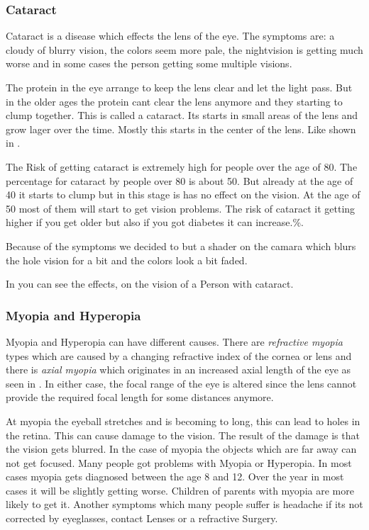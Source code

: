 \documentclass{sig-alternate-05-2015}
\begin{document}
\subsubsection{Cataract}

Cataract is a disease which effects the lens of the eye. The symptoms are: a cloudy of blurry vision, the colors seem more pale, the nightvision is getting much worse and in some cases the person getting some multiple visions.

The protein in the eye arrange to keep the lens clear and let the light pass. But in the older ages the protein cant clear the lens anymore and they starting to clump together. This is called a cataract. Its starts in small areas of the lens and grow lager over the time. Mostly this starts in the center of the lens. Like shown in .

The Risk of getting cataract is extremely high for people over the age of 80. The percentage for cataract by people over 80 is about 50. But already at the age of 40 it starts to clump but in this stage is has no effect on the vision. At the age of 50 most of them will start to get vision problems. The risk of cataract it getting higher if you get older but also if you got diabetes it can increase.\%.~\cite{cataractfacts}

Because of the symptoms we decided to but a shader on the camara which blurs the hole vision for a bit and the colors look a bit faded.

In  you can see the effects, on the vision of a Person with cataract.

\subsubsection{Myopia and Hyperopia}

Myopia and Hyperopia can have different causes. There are \emph{refractive myopia} types which are caused by a changing refractive index of the cornea or lens and there is \emph{axial myopia} which originates in an increased axial length of the eye as seen in .
In either case, the focal range of the eye is altered since the lens cannot provide the required focal length for some distances anymore.

At myopia the eyeball stretches and is becoming to long, this can lead to holes in the retina. This can cause damage to the vision. The result of the damage is that the vision gets blurred. In the case of myopia the objects which are far away can not get focused. Many people got problems with Myopia or Hyperopia. In most cases myopia gets diagnosed between the age 8 and 12. Over the year in most cases it will be slightly getting worse. Children of parents with myopia are more likely to get it. Another symptoms which many people suffer is headache if its not corrected by eyeglasses, contact Lenses or a refractive Surgery.
\end{document}
